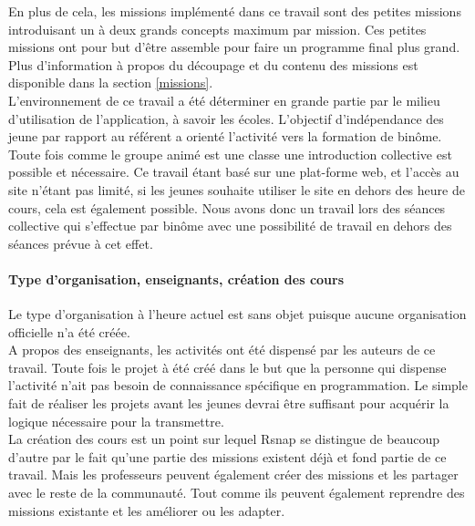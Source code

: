 En plus de cela, les missions implémenté dans ce travail sont des petites missions introduisant un à deux grands concepts maximum par mission. Ces petites missions ont pour but d'être assemble pour faire un programme final plus grand. Plus d'information à propos du découpage et du contenu des missions est disponible dans la section \ref{missions}.\\

L'environnement de ce travail a été déterminer en grande partie par le milieu d'utilisation de l'application, à savoir les écoles. L'objectif d'indépendance des jeune par rapport au référent a orienté l'activité vers la formation de binôme. Toute fois comme le groupe animé est une classe une introduction collective est possible et nécessaire. Ce travail étant basé sur une plat-forme web, et l'accès au site n'étant pas limité, si les jeunes souhaite utiliser le site en dehors des heure de cours, cela est également possible.
Nous avons donc un travail lors des séances collective qui s'effectue par binôme avec une possibilité de travail en dehors des séances prévue à cet effet.

\paragraph{Type d'organisation, enseignants, création des cours}Le type d'organisation à l'heure actuel est sans objet puisque aucune organisation officielle n'a été créée.\\

A propos des enseignants, les activités ont été dispensé par les auteurs de ce travail. Toute fois le projet à été créé dans le but que la personne qui dispense l'activité n'ait pas besoin de connaissance spécifique en programmation. Le simple fait de réaliser les projets avant les jeunes devrai être suffisant pour acquérir la logique nécessaire pour la transmettre.\\

La création des cours est un point sur lequel Rsnap se distingue de beaucoup d'autre par le fait qu'une partie des missions existent déjà et fond partie de ce travail. Mais les professeurs peuvent également créer des missions et les partager avec le reste de la communauté. Tout comme ils peuvent également reprendre des missions existante et les améliorer ou les adapter. %